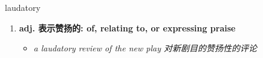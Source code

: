 
\begin{frame}
{\huge laudatory}
\begin{center}
\begin{enumerate}\Large
  \item \textbf{adj. 表示赞扬的: of, relating to, or expressing praise}
  \begin{itemize}
    \item \em{\Large{a laudatory review of the new play 对新剧目的赞扬性的评论}}
  \end{itemize}
\end{enumerate}
\end{center}
\end{frame}
